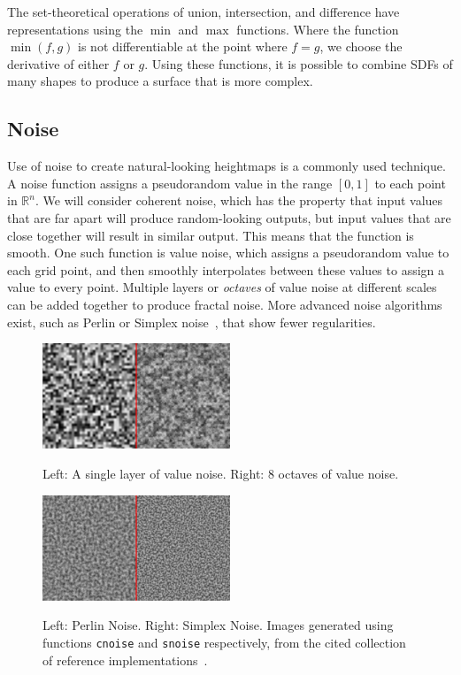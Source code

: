 \documentclass[11pt]{article}
\begin{document}
The set-theoretical operations of union, intersection, and difference have representations using the $\min$ and $\max$ functions. Where the function $\min\left(f,g\right)$ is not differentiable at the point where $f = g$, we choose the derivative of either $f$ or $g$. Using these functions, it is possible to combine SDFs of many shapes to produce a surface that is more complex.

\subsection{Noise}
\label{section:noise}
Use of noise to create natural-looking heightmaps is a commonly used technique. A noise function assigns a pseudorandom value in the range $\left[0,1\right]$ to each point in $\mathbb{R}^n$. We will consider coherent noise, which has the property that input values that are far apart will produce random-looking outputs, but input values that are close together will result in similar output. This means that the function is smooth. One such function is value noise, which assigns a pseudorandom value to each grid point, and then smoothly interpolates between these values to assign a value to every point. Multiple layers or \textit{octaves} of value noise at different scales can be added together to produce fractal noise. More advanced noise algorithms exist, such as Perlin or Simplex noise~\cite{PerlinChapter2N}, that show fewer regularities.

\begin{figure}
  \caption{Left: A single layer of value noise. Right: 8 octaves of value noise.}
  \includegraphics[width=0.5\textwidth]{value_noise.png}
  \label{fig:value_noise}
\end{figure}

\begin{figure}
  \caption{Left: Perlin Noise. Right: Simplex Noise. Images generated using functions \texttt{cnoise} and \texttt{snoise} respectively, from the cited collection of reference implementations~\cite{github_2014}.}
  \includegraphics[width=0.5\textwidth]{better_noise.png}
  \label{fig:better_noise}
\end{figure}
\end{document}
